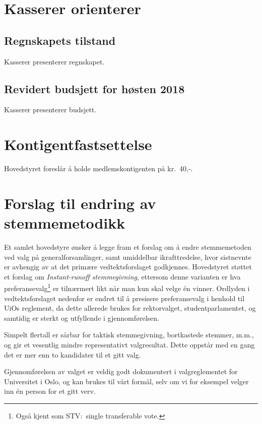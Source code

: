 \documentclass[10pt,norsk,a4paper]{article}
\begin{document}

\section{Kasserer orienterer}
\subsection{Regnskapets tilstand}
Kasserer presenterer regnskapet.


\subsection{Revidert budsjett for høsten 2018}
Kasserer presenterer budsjett.


\section{Kontigentfastsettelse}
Hovedstyret foreslår å holde medlemskontigenten på kr.~40,-.

\section{Forslag til endring av stemmemetodikk}

Et samlet hovedstyre ønsker å legge fram et forslag om å endre stemmemetoden ved valg på generalforsamlinger, samt umiddelbar ikrafttredelse, hvor sistnevnte er avhengig av at det primære vedtektsforslaget godkjennes. Hovedstyret støttet et forslag om \textit{Instant-runoff stemmegivning}, ettersom denne varianten er hva preferansevalg\footnote{Også kjent som STV:\ single transferable vote.} er tilnærmert likt når man kun skal velge én vinner. Ordlyden i vedtektsforslaget nedenfor er endret til å presisere preferansevalg i henhold til UiOs reglement, da dette allerede brukes for rektorvalget, studentparlamentet, og samtidig er sterkt og utfyllende i gjennomførelsen.

\begin{description}[style=nextline]
	\item[Hvorfor bytte vekk fra simpelt flertall?]
		Simpelt flertall er sårbar for taktisk stemmegivning, bortkastede stemmer, m.m., og gir et vesentlig mindre representativt valgresultat. Dette oppstår med en gang det er mer enn to kandidater til et gitt valg.

	\item[Hvordan vil valget utføres med preferansevalg?]
		Gjennomførelsen av valget er veldig godt dokumentert i valgreglementet for Universitet i Oslo, og kan brukes til vårt formål, selv om vi for eksempel velger inn én person for et gitt verv.
		

\end{description}
\end{document}
